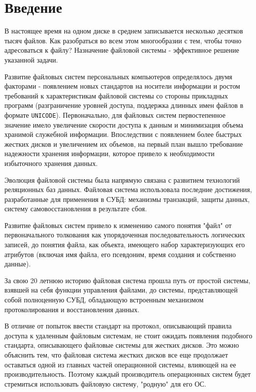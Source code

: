 \documentclass{article}
\begin{document}
    \tableofcontents{}
    \newpage

    \section{Введение}
    В настоящее время на одном диске в среднем записывается несколько десятков 
    тысяч файлов. Как разобраться во всем этом многообразии с тем, чтобы точно 
    адресоваться к файлу? Назначение файловой системы - эффективное решение 
    указанной задачи.

    Развитие файловых систем персональных компьютеров определялось двумя 
    факторами - появлением новых стандартов на носители информации и ростом 
    требований к характеристикам файловой системы со стороны прикладных 
    программ (разграничение уровней доступа, поддержка длинных имен файлов в 
    формате \texttt{UNICODE}). Первоначально, для файловых систем первостепенное 
    значение имело увеличение скорости доступа к данным и минимизация объема 
    хранимой служебной информации. Впоследствии с появлением более быстрых 
    жестких дисков и увеличением их объемов, на первый план вышло требование 
    надежности хранения информации, которое привело к необходимости избыточного 
    хранения данных.
    
    Эволюция файловой системы была напрямую связана с развитием технологий 
    реляционных баз данных. Файловая система использовала последние достижения, 
    разработанные для применения в СУБД: механизмы транзакций, защиты данных, 
    систему самовосстановления в результате сбоя.
    
    Развитие файловых систем привело к изменению самого понятия "файл" от 
    первоначального толкования как упорядоченная последовательность логических 
    записей, до понятия файла, как объекта, имеющего набор характеризующих его 
    атрибутов (включая имя файла, его псевдоним, время создания и собственно 
    данные).
    
    За свою 20 летнюю историю файловая система прошла путь от простой системы, 
    взявшей на себя функции управления файлами, до системы, представляющей 
    собой полноценную СУБД, обладающую встроенным механизмом протоколирования 
    и восстановления данных.
    
    В отличие от попыток ввести стандарт на протокол, описывающий правила 
    доступа к удаленным файловым системам, не стоит ожидать появления подобного 
    стандарта, описывающего файловые системы для жестких дисков. Это можно 
    объяснить тем, что файловая система жестких дисков все еще продолжает 
    оставаться одной из главных частей операционной системы, влияющей на ее 
    производительность. Поэтому каждый производитель операционных систем будет 
    стремиться использовать файловую систему, "родную" для его ОС.
    
\end{document}
